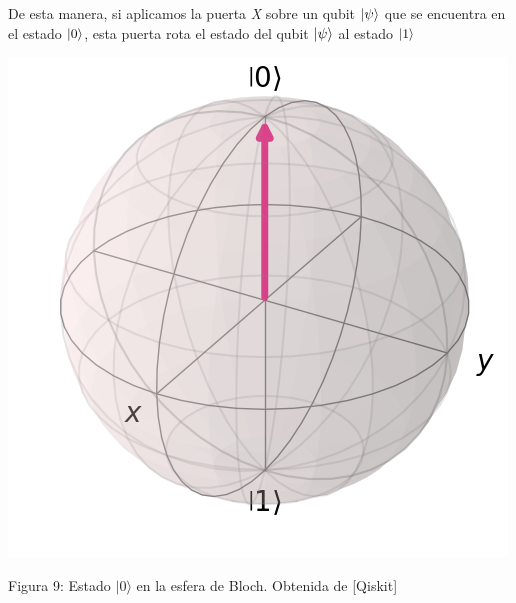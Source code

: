 \documentclass{article}
\numberwithin{equation}{section} %
\begin{document}
    \vspace{2.5mm}

    De esta manera, si aplicamos la puerta \textit{X} sobre un qubit \( \ket{\psi} \) que se encuentra en el estado \( \ket{0} \), esta puerta rota el estado del qubit \( \ket{\psi} \) al estado \( \ket{1} \)

    \vspace{5mm}

    \begin{minipage}{0.1\textwidth}
        \hfill
    \end{minipage}
    \begin{minipage}{0.3\textwidth}
        \centering
        \includegraphics[width=\textwidth]{img/Bloch/bloch_state_0.png}
        \caption{Figura 9: Estado $|0\rangle$ en la esfera de Bloch. Obtenida de [Qiskit]}
    \end{minipage}
    \hfill
    \hfill
\end{document}

